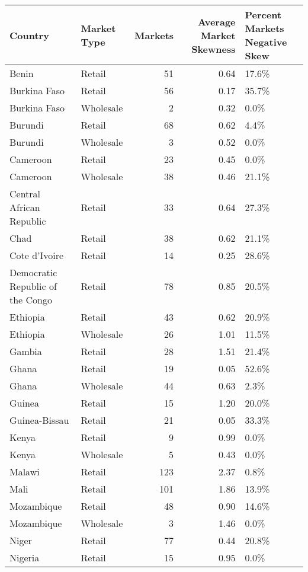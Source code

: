 \begin{table}[ht]
\centering
\begin{tabular}{llrrl}
  \hline
Country & Market Type & Markets & Average Market Skewness  & Percent Markets Negative Skew \\ 
  \hline
Benin & Retail &  51 & 0.64 & 17.6\% \\ 
  Burkina Faso & Retail &  56 & 0.17 & 35.7\% \\ 
  Burkina Faso & Wholesale &   2 & 0.32 & 0.0\% \\ 
  Burundi & Retail &  68 & 0.62 & 4.4\% \\ 
  Burundi & Wholesale &   3 & 0.52 & 0.0\% \\ 
  Cameroon & Retail &  23 & 0.45 & 0.0\% \\ 
  Cameroon & Wholesale &  38 & 0.46 & 21.1\% \\ 
  Central African Republic & Retail &  33 & 0.64 & 27.3\% \\ 
  Chad & Retail &  38 & 0.62 & 21.1\% \\ 
  Cote d'Ivoire & Retail &  14 & 0.25 & 28.6\% \\ 
  Democratic Republic of the Congo & Retail &  78 & 0.85 & 20.5\% \\ 
  Ethiopia & Retail &  43 & 0.62 & 20.9\% \\ 
  Ethiopia & Wholesale &  26 & 1.01 & 11.5\% \\ 
  Gambia & Retail &  28 & 1.51 & 21.4\% \\ 
  Ghana & Retail &  19 & 0.05 & 52.6\% \\ 
  Ghana & Wholesale &  44 & 0.63 & 2.3\% \\ 
  Guinea & Retail &  15 & 1.20 & 20.0\% \\ 
  Guinea-Bissau & Retail &  21 & 0.05 & 33.3\% \\ 
  Kenya & Retail &   9 & 0.99 & 0.0\% \\ 
  Kenya & Wholesale &   5 & 0.43 & 0.0\% \\ 
  Malawi & Retail & 123 & 2.37 & 0.8\% \\ 
  Mali & Retail & 101 & 1.86 & 13.9\% \\ 
  Mozambique & Retail &  48 & 0.90 & 14.6\% \\ 
  Mozambique & Wholesale &   3 & 1.46 & 0.0\% \\ 
  Niger & Retail &  77 & 0.44 & 20.8\% \\ 
  Nigeria & Retail &  15 & 0.95 & 0.0\% \\ 

\end{tabular}
\end{table}
